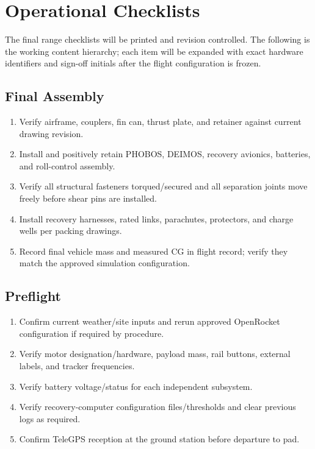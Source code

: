 \documentclass[10pt]{article}
\begin{document}
\section{Operational Checklists}
The final range checklists will be printed and revision controlled. The following is the working content hierarchy; each item will be expanded with exact hardware identifiers and sign-off initials after the flight configuration is frozen.

\subsection{Final Assembly}
\begin{enumerate}
\item Verify airframe, couplers, fin can, thrust plate, and retainer against current drawing revision.
\item Install and positively retain PHOBOS, DEIMOS, recovery avionics, batteries, and roll-control assembly.
\item Verify all structural fasteners torqued/secured and all separation joints move freely before shear pins are installed.
\item Install recovery harnesses, rated links, parachutes, protectors, and charge wells per packing drawings.
\item Record final vehicle mass and measured CG in flight record; verify they match the approved simulation configuration.
\end{enumerate}

\subsection{Preflight}
\begin{enumerate}
\item Confirm current weather/site inputs and rerun approved OpenRocket configuration if required by procedure.
\item Verify motor designation/hardware, payload mass, rail buttons, external labels, and tracker frequencies.
\item Verify battery voltage/status for each independent subsystem.
\item Verify recovery-computer configuration files/thresholds and clear previous logs as required.
\item Confirm TeleGPS reception at the ground station before departure to pad.
\end{enumerate}
\end{document}
